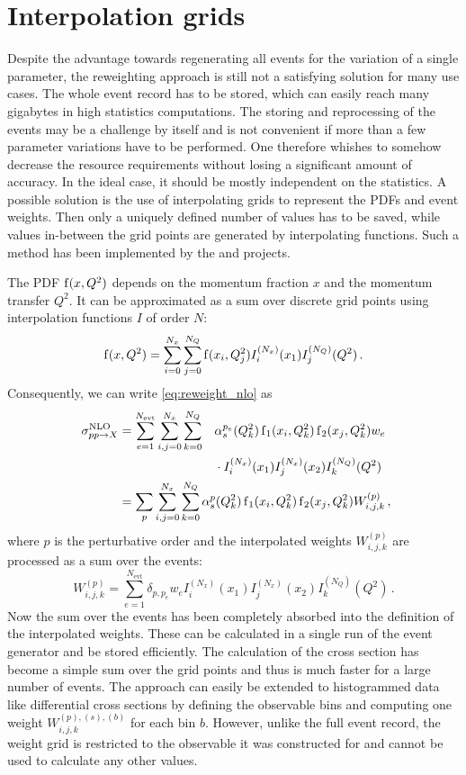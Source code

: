 \section{Interpolation grids}
Despite the advantage towards regenerating all events for the variation of a single parameter, the reweighting approach is still not a satisfying solution for many use cases.
The whole event record has to be stored, which can easily reach many gigabytes in high statistics computations.
The storing and reprocessing of the events may be a challenge by itself and is not convenient if more than a few parameter variations have to be performed.
One therefore whishes to somehow decrease the resource requirements without losing a significant amount of accuracy.
In the ideal case, it should be mostly independent on the statistics.
A possible solution is the use of interpolating grids to represent the PDFs and event weights.
Then only a uniquely defined number of values has to be saved, while values in-between the grid points are generated by interpolating functions.
Such a method has been implemented by the \appl{} \cite{applgrid2010} and \fnlo{} \cite{fastnlo2006,fastnlo2011} projects.

The PDF $\operatorname{f}(x,Q^2)$ depends on the momentum fraction $x$ and the momentum transfer $Q^2$.
It can be approximated as a sum over discrete grid points using interpolation functions $I$ of order $N$:
%
\begin{equation}
	\operatorname{f}(x,Q^2) = \sum_{i=0}^{N_x} \sum_{j=0}^{N_Q} \operatorname{f}(x_i,Q_j^2) I_i^{(N_x)}(x_1) I_j^{(N_Q)}(Q^2) \, .
\end{equation}
%
Consequently, we can write \cref{eq:reweight_nlo} as
%
\begin{alignat}{3}
  \sigma^\text{NLO}_{pp \rightarrow X}	&= \sum_{e=1}^{N_\text{evt}} \sum_{i,j=0}^{N_x} \sum_{k=0}^{N_Q} &&\alpha_s^{p_e}(Q_k^2) \pdf_1(x_i,Q_k^2) \pdf_2(x_j,Q_k^2) w_e \nonumber \\
  										&	&&\cdot I_i^{(N_x)}(x_1) I_j^{(N_x)}(x_2) I_k^{(N_Q)}(Q^2) \nonumber \\
  										&= \mathrlap{\sum_p \sum_{i,j=0}^{N_x} \sum_{k=0}^{N_Q} \alpha_s^p(Q_k^2) \pdf_1(x_i,Q_k^2) \pdf_2(x_j,Q_k^2) W_{i,j,k}^{(p)} \, ,}
\end{alignat}
%
where $p$ is the perturbative order and the interpolated weights $W_{i,j,k}^{(p)}$ are processed as a sum over the events:
\begin{equation}
	W_{i,j,k}^{(p)} = \sum_{e=1}^{N_\text{evt}} \delta_{p,p_e} w_e I_i^{(N_x)}(x_1) I_j^{(N_x)}(x_2) I_k^{(N_Q)}(Q^2) \, .
\end{equation}
%
Now the sum over the events has been completely absorbed into the definition of the interpolated weights.
These can be calculated in a single run of the event generator and be stored efficiently.
The calculation of the cross section has become a simple sum over the grid points and thus is much faster for a large number of events.
The approach can easily be extended to histogrammed data like differential cross sections by defining the observable bins and computing one weight $W_{i,j,k}^{(p),(s),(b)}$ for each bin $b$.
However, unlike the full event record, the weight grid is restricted to the observable it was constructed for and cannot be used to calculate any other values.

